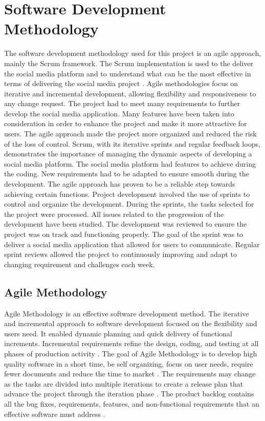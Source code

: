 \section{ Software Development Methodology} 
The software development methodology used for this project is an agile approach, mainly the Scrum framework. The Scrum implementation is used to the deliver the social media platform and to understand what can be the most effective in terms of delivering the social media project \cite{garzaniti2019effectiveness}. Agile methodologies focus on iterative and incremental development, allowing flexibility and responsiveness to any change request. The project had to meet many requirements to further develop the social media application. Many features have been taken into consideration in order to enhance the project and make it more attractive for users. The agile approach made the project more organized and reduced the risk of the loss of control. Scrum, with its iterative sprints and regular feedback loops, demonstrates the importance of managing the dynamic aspects of developing a social media platform. The social media platform had features to achieve during the coding. New requirements had to be adapted to ensure smooth during the development. The agile approach has proven to be a reliable step towards achieving certain functions. Project development involved the use of sprints to control and organize the development. During the sprints, the tasks selected for the project were processed. All issues related to the progression of the development have been studied. The development was reviewed to ensure the project was on track and functioning properly. The goal of the sprint was to deliver a social media application that allowed for users to communicate. Regular sprint reviews allowed the project to continuously improving and adapt to changing requirement and challenges each week.

\subsection{Agile Methodology}
Agile Methodology is an effective software development method. The iterative and incremental approach to software development focused on the flexibility and users need. It enabled dynamic planning and quick delivery of functional increments. Incremental requirements refine the design, coding, and testing at all phases of production activity \cite{kumar2012impact}. The goal of Agile Methodology is to develop high quality software in a short time, be self organizing, focus on user needs, require fewer documents and reduce the time to market \cite{kumar2012impact}. The requirements may change as the tasks are divided into multiple iterations to create a release plan that advance the project through the iteration phase \cite{altameem2015impact}. The product backlog contains all the bug fixes, requirements, features, and non-functional requirements that an effective software must address \cite{altameem2015impact}.

